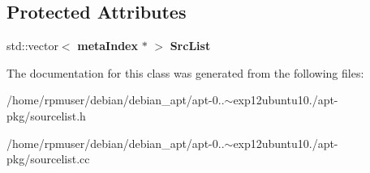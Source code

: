 \subsection*{\-Protected \-Attributes}
\begin{DoxyCompactItemize}
\item 
std\-::vector$<$ {\bf meta\-Index} $\ast$ $>$ {\bfseries \-Src\-List}\label{classpkgSourceList_a2d217e4ad22f286ec508cad5020695ba}

\end{DoxyCompactItemize}


\-The documentation for this class was generated from the following files\-:\begin{DoxyCompactItemize}
\item 
/home/rpmuser/debian/debian\-\_\-apt/apt-\/0..$\sim$exp12ubuntu10./apt-\/pkg/sourcelist.\-h\item 
/home/rpmuser/debian/debian\-\_\-apt/apt-\/0..$\sim$exp12ubuntu10./apt-\/pkg/sourcelist.\-cc\end{DoxyCompactItemize}
